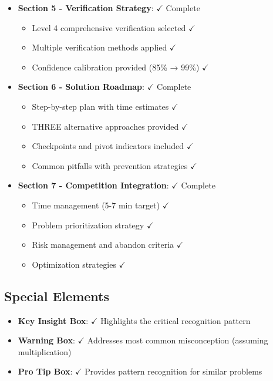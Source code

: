 \documentclass[11pt]{article}
\begin{document}
\begin{itemize}[leftmargin=*]
    \item \textbf{Section 5 - Verification Strategy}: $\checkmark$ Complete
    \begin{itemize}
        \item Level 4 comprehensive verification selected $\checkmark$
        \item Multiple verification methods applied $\checkmark$
        \item Confidence calibration provided (85\% → 99\%) $\checkmark$
    \end{itemize}
    
    \item \textbf{Section 6 - Solution Roadmap}: $\checkmark$ Complete
    \begin{itemize}
        \item Step-by-step plan with time estimates $\checkmark$
        \item THREE alternative approaches provided $\checkmark$
        \item Checkpoints and pivot indicators included $\checkmark$
        \item Common pitfalls with prevention strategies $\checkmark$
    \end{itemize}
    
    \item \textbf{Section 7 - Competition Integration}: $\checkmark$ Complete
    \begin{itemize}
        \item Time management (5-7 min target) $\checkmark$
        \item Problem prioritization strategy $\checkmark$
        \item Risk management and abandon criteria $\checkmark$
        \item Optimization strategies $\checkmark$
    \end{itemize}
\end{itemize}

\subsection*{Special Elements}
\begin{itemize}[leftmargin=*]
    \item \textbf{Key Insight Box}: $\checkmark$ Highlights the critical recognition pattern
    \item \textbf{Warning Box}: $\checkmark$ Addresses most common misconception (assuming multiplication)
    \item \textbf{Pro Tip Box}: $\checkmark$ Provides pattern recognition for similar problems
\end{itemize}
\end{document}
